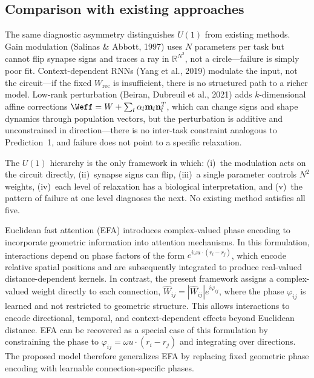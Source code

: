 \documentclass[11pt]{article}
\begin{document}
\subsection {Comparison with existing approaches} 
The same 
diagnostic asymmetry distinguishes $U(1)$ from existing methods. 
Gain modulation (Salinas \& Abbott, 1997) uses $N$ parameters 
per task but cannot flip synapse signs and traces a ray in 
$\mathbb{R}^{N^2}$, not a circle---failure is simply poor fit. 
Context-dependent RNNs (Yang et al., 2019) modulate the input, 
not the circuit---if the fixed $W_{\text{rec}}$ is insufficient, 
there is no structured path to a richer model. Low-rank 
perturbation (Beiran, Dubreuil et al., 2021) adds 
$k$-dimensional affine corrections $\Weff = W + \sum_l 
\alpha_l \mathbf{m}_l \mathbf{n}_l^T$, which can change signs 
and shape dynamics through population vectors, but the 
perturbation is additive and unconstrained in direction---there 
is no inter-task constraint analogous to Prediction~1, and 
failure does not point to a specific relaxation.

The $U(1)$ hierarchy is the only framework in which:
(i)~the modulation acts on the circuit directly,
(ii)~synapse signs can flip,
(iii)~a single parameter controls $N^2$ weights,
(iv)~each level of relaxation has a biological interpretation,
and (v)~the pattern of failure at one level diagnoses the next.
No existing method satisfies all five.

Euclidean fast attention (EFA) introduces complex-valued phase encoding to incorporate geometric information into attention mechanisms. In this formulation, interactions depend on phase factors of the form $e^{i \omega u \cdot (r_i - r_j)}$, which encode relative spatial positions and are subsequently integrated to produce real-valued distance-dependent kernels. In contrast, the present framework assigns a complex-valued weight directly to each connection, $\hat{W}_{ij} = |\hat{W}_{ij}| e^{i \varphi_{ij}}$, where the phase $\varphi_{ij}$ is learned and not restricted to geometric structure. This allows interactions to encode directional, temporal, and context-dependent effects beyond Euclidean distance. EFA can be recovered as a special case of this formulation by constraining the phase to $\varphi_{ij} = \omega u \cdot (r_i - r_j)$ and integrating over directions. The proposed model therefore generalizes EFA by replacing fixed geometric phase encoding with learnable connection-specific phases.

\end{document}
